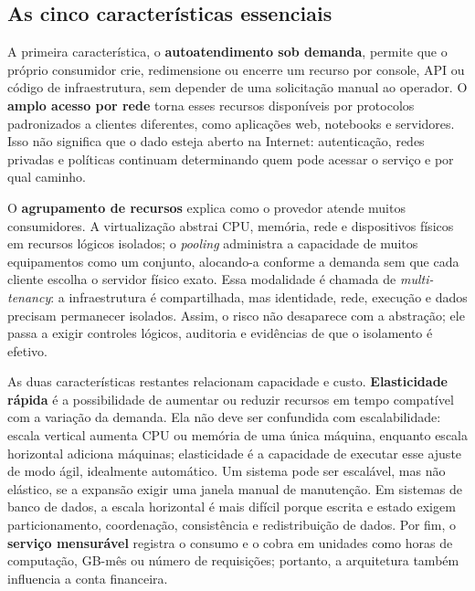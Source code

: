 \documentclass[11pt,a4paper]{article}
\begin{document}
\subsection{As cinco características essenciais}
A primeira característica, o \textbf{autoatendimento sob demanda}, permite que o próprio consumidor
crie, redimensione ou encerre um recurso por console, API ou código de infraestrutura, sem depender
de uma solicitação manual ao operador. O \textbf{amplo acesso por rede} torna esses recursos
disponíveis por protocolos padronizados a clientes diferentes, como aplicações web, notebooks e
servidores. Isso não significa que o dado esteja aberto na Internet: autenticação, redes privadas e
políticas continuam determinando quem pode acessar o serviço e por qual caminho.

O \textbf{agrupamento de recursos} explica como o provedor atende muitos consumidores. A
virtualização abstrai CPU, memória, rede e dispositivos físicos em recursos lógicos isolados; o
\emph{pooling} administra a capacidade de muitos equipamentos como um conjunto, alocando-a conforme
a demanda sem que cada cliente escolha o servidor físico exato. Essa modalidade é chamada de
\emph{multi-tenancy}: a infraestrutura é compartilhada, mas identidade, rede, execução e dados
precisam permanecer isolados. Assim, o risco não desaparece com a abstração; ele passa a exigir
controles lógicos, auditoria e evidências de que o isolamento é efetivo.

As duas características restantes relacionam capacidade e custo. \textbf{Elasticidade rápida} é a
possibilidade de aumentar ou reduzir recursos em tempo compatível com a variação da demanda. Ela não
deve ser confundida com escalabilidade: escala vertical aumenta CPU ou memória de uma única máquina,
enquanto escala horizontal adiciona máquinas; elasticidade é a capacidade de executar esse ajuste de
modo ágil, idealmente automático. Um sistema pode ser escalável, mas não elástico, se a expansão
exigir uma janela manual de manutenção. Em sistemas de banco de dados, a escala horizontal é mais
difícil porque escrita e estado exigem particionamento, coordenação, consistência e redistribuição de
dados. Por fim, o \textbf{serviço mensurável} registra o consumo e o cobra em unidades como horas
de computação, GB-mês ou número de requisições; portanto, a arquitetura também influencia a conta
financeira.
\end{document}
